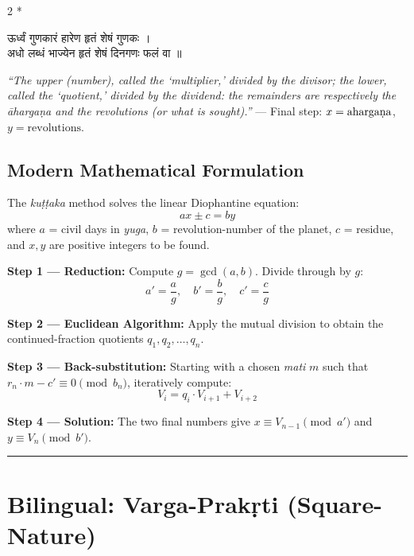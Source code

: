 \documentclass[11pt,a4paper]{article}
\newcommand{\longline}{\noindent\rule{\textwidth}{0.4pt}}
\newcommand{\dev}[1]{{\devanagarifont #1}}
\theoremstyle{definition}
\begin{document}
\begin{paracol}{2}
\switchcolumn[0]*\noindent
\begin{tcolorbox}[colback=sktbg,colframe=vertrule,boxrule=0.5pt,arc=3pt]
\dev{ऊर्ध्वं गुणकारं हारेण हृतं शेषं गुणकः ।\\
अधो लब्धं भाज्येन हृतं शेषं दिनगणः फलं वा ॥}
\end{tcolorbox}

\switchcolumn\noindent
\begin{tcolorbox}[colback=transbg,colframe=vertrule!60,boxrule=0.5pt,arc=3pt]
\textit{``The upper (number), called the `multiplier,' divided by the divisor; the lower, called the `quotient,' divided by the dividend: the remainders are respectively the \=aharga\d{n}a and the revolutions (or what is sought).''} --- Final step: $x = \text{aharga\d{n}a}$, $y = \text{revolutions}$.
\end{tcolorbox}

\end{paracol}

\subsection*{Modern Mathematical Formulation}

The \textit{ku\d{t}\d{t}aka} method solves the linear Diophantine equation:
\[
ax \pm c = by
\]
where $a$ = civil days in \textit{yuga}, $b$ = revolution-number of the planet, $c$ = residue, and $x, y$ are positive integers to be found.

\textbf{Step 1 --- Reduction:} Compute $g = \gcd(a,b)$. Divide through by $g$:
\[
a' = \frac{a}{g}, \quad b' = \frac{b}{g}, \quad c' = \frac{c}{g}
\]

\textbf{Step 2 --- Euclidean Algorithm:} Apply the mutual division to obtain the continued-fraction quotients $q_1, q_2, \ldots, q_n$.

\textbf{Step 3 --- Back-substitution:} Starting with a chosen \textit{mati} $m$ such that $r_n \cdot m - c' \equiv 0 \pmod{b_n}$, iteratively compute:
\[
V_i = q_i \cdot V_{i+1} + V_{i+2}
\]

\textbf{Step 4 --- Solution:} The two final numbers give $x \equiv V_{n-1} \pmod{a'}$ and $y \equiv V_n \pmod{b'}$.

\longline

\section*{Bilingual: Varga-Prak\d{r}ti (Square-Nature)}
\end{document}
